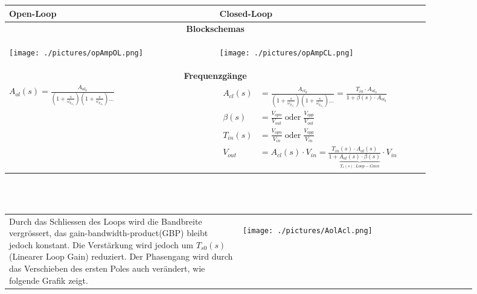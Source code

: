 \begin{tabular}{|p{0.45\linewidth}|p{0.45\linewidth}|}
	\hline
	\textbf{Open-Loop}
		& \textbf{Closed-Loop}\\
	\hline
	\multicolumn{2}{|c|}{\textbf{Blockschemas}}\\
	\hline
    \vspace{-7mm}
	\begin{center}
	 	\texttt{[image: ./pictures/opAmpOL.png]}
	\end{center}
		& \vspace{-7mm}
          \begin{center}
			\texttt{[image: ./pictures/opAmpCL.png]}
		  \end{center}\\
	\hline
	\multicolumn{2}{|c|}{\textbf{Frequenzgänge}}\\
	\hline
	\large{$A_{ol}(s)=\frac{A_{ol_0}}{(1+\frac{s}{\omega_{p_{ol_1}}})(1+\frac{s}{\omega_{p_{ol_2}}})\dots}$}
	& $\begin{aligned}
        A_{cl}(s) &= \frac{A_{cl_0}}{(1+\frac{s}{\omega_{p_{cl_1}}})(1+\frac{s}{\omega_{p_{cl_2}}})\dots} = \frac{T_{in}\cdot A_{ol_0}}{1+\beta(s)\cdot A_{ol_0}}\\
		\beta(s) &= \frac{V_{opn}}{V_{out}}\;\text{oder}\;\frac{V_{opp}}{V_{out}}\\
		T_{in}(s) &= \frac{V_{opn}}{V_{in}}\;\text{oder}\;\frac{V_{opp}}{V_{in}}\\
        V_{out} &= A_{cl}(s)\cdot V_{in} = \frac{T_{in}(s)\cdot A_{ol}(s)}{1 + \underbrace{A_{ol}(s)\cdot \beta(s)}_{T_s(s):Loop-Gain}} \cdot V_{in}
	   \end{aligned}$\\
	\hline
\end{tabular}
\\ \\
 \renewcommand{\arraystretch}{1.5}
\begin{tabular}{m{0.45\linewidth}m{0.45\linewidth}}
	Durch das Schliessen des Loops wird die Bandbreite vergrössert, das gain-bandwidth-product(GBP) bleibt jedoch konstant. Die Verstärkung wird jedoch um $T_{s0}(s)$ (Linearer Loop Gain) reduziert. Der Phasengang wird durch das Verschieben des ersten Poles auch verändert, wie folgende Grafik zeigt.
	& \begin{center}
        \texttt{[image: ./pictures/AolAcl.png]}
    \end{center}
\end{tabular}
\vspace{-7mm}
